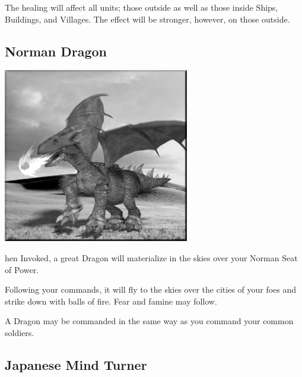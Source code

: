 The healing will affect all units; those outside as well as those inside Ships, Buildings, and Villages. The effect will be stronger, however, on those outside.

\subsection{Norman Dragon}


\begin{center}
	\includegraphics[width=1\linewidth]{Adragon}
\end{center}

hen Invoked, a great Dragon will materialize in the skies over your Norman Seat of Power.

Following your commands, it will fly to the skies over the cities of your foes and strike down with balls of fire. Fear and famine may follow.

A Dragon may be commanded in the same way as you command your common soldiers.

\subsection{Japanese Mind Turner}


